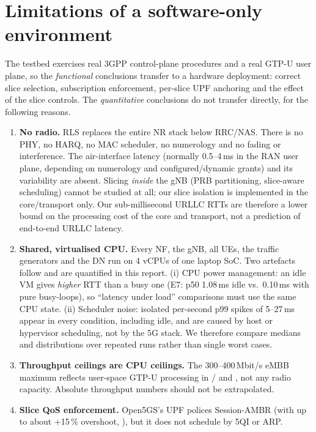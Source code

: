 \section{Limitations of a software-only environment}\label{sec:limits}
The testbed exercises real 3GPP control-plane procedures and a real GTP-U user plane, so the
\emph{functional} conclusions transfer to a hardware deployment: correct slice selection,
subscription enforcement, per-slice UPF anchoring and the effect of the slice controls. The
\emph{quantitative} conclusions do not transfer directly, for the following reasons.

\begin{enumerate}
\item \textbf{No radio.} RLS replaces the entire NR stack below RRC/NAS. There is no PHY, no
  HARQ, no MAC scheduler, no numerology and no fading or interference. The air-interface
  latency (normally 0.5--4\,ms in the RAN user plane, depending on numerology and
  configured/dynamic grants) and its variability are absent. Slicing \emph{inside} the gNB
  (PRB partitioning, slice-aware scheduling) cannot be studied at all; our slice isolation
  is implemented in the core/transport only. Our sub-millisecond URLLC RTTs are therefore a
  lower bound on the processing cost of the core and transport, not a prediction of
  end-to-end URLLC latency.
\item \textbf{Shared, virtualised CPU.} Every NF, the gNB, all UEs, the traffic generators and
  the DN run on 4 vCPUs of one laptop SoC. Two artefacts follow and are quantified in this
  report. (i) CPU power management: an idle VM gives \emph{higher} RTT than a busy one
  (E7: p50 1.08\,ms idle vs.\ 0.10\,ms with pure busy-loops), so ``latency under load''
  comparisons must use the same CPU state. (ii) Scheduler noise: isolated per-second p99
  spikes of 5--27\,ms appear in every condition, including idle, and are caused by host or
  hypervisor scheduling, not by the 5G stack. We therefore compare medians and distributions
  over repeated runs rather than single worst cases.
\item \textbf{Throughput ceilings are CPU ceilings.} The 300--400\,Mbit/s eMBB maximum reflects
  user-space GTP-U processing in / and , not any
  radio capacity. Absolute throughput numbers should not be extrapolated.
\item \textbf{Slice QoS enforcement.} Open5GS's UPF polices Session-AMBR (with up to about
  +15\,\% overshoot, ), but it does not schedule by 5QI or ARP.

\end{enumerate}
